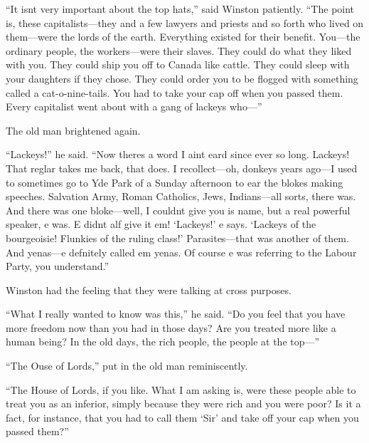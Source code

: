 ``It isn\textquotesingle t very important about the top hats,'' said
Winston patiently. ``The point is, these capitalists---they and a few
lawyers and priests and so forth who lived on them---were the lords of
the earth. Everything existed for their benefit. You---the ordinary
people, the workers---were their slaves. They could do what they liked
with you. They could ship you off to Canada like cattle. They could
sleep with your daughters if they chose. They could order you to be
flogged with something called a cat-o\textquotesingle-nine-tails. You
had to take your cap off when you passed them. Every capitalist went
about with a gang of lackeys who---''

The old man brightened again.

``Lackeys!'' he said. ``Now there\textquotesingle s a word I
ain\textquotesingle t \textquotesingle eard since ever so long. Lackeys!
That reg\textquotesingle lar takes me back, that does. I recollect---oh,
donkey\textquotesingle s years ago---I used to sometimes go to
\textquotesingle Yde Park of a Sunday afternoon to \textquotesingle ear
the blokes making speeches. Salvation Army, Roman Catholics, Jews,
Indians---all sorts, there was. And there was one bloke---well, I
couldn\textquotesingle t give you \textquotesingle is name, but a real
powerful speaker, \textquotesingle e was. \textquotesingle E
didn\textquotesingle t \textquotesingle alf give it \textquotesingle em!
`Lackeys!' \textquotesingle e says.
`Lackeys of the bourgeoisie! Flunkies of the ruling
class!' Parasites---that was another of them. And
\textquotesingle yenas---\textquotesingle e def\textquotesingle nitely
called \textquotesingle em \textquotesingle yenas. Of course
\textquotesingle e was referring to the Labour Party, you understand.''

Winston had the feeling that they were talking at cross purposes.

``What I really wanted to know was this,'' he said. ``Do you feel that you
have more freedom now than you had in those days? Are you treated more
like a human being? In the old days, the rich people, the people at the
top---''

``The \textquotesingle Ouse of Lords,'' put in the old man reminiscently.

``The House of Lords, if you like. What I am asking is, were these people
able to treat you as an inferior, simply because they were rich and you
were poor? Is it a fact, for instance, that you had to call them
`Sir' and take off your cap when you
passed them?''

